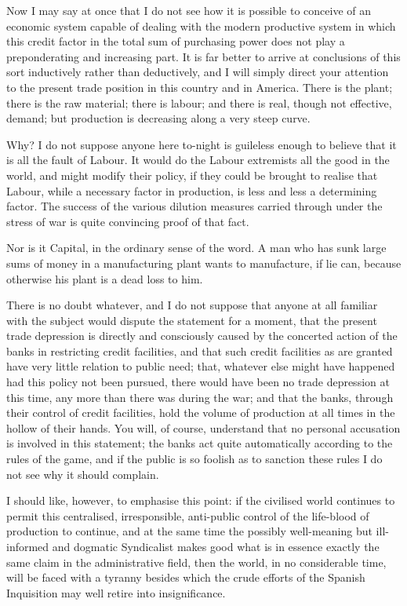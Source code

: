 \documentclass{book}
\begin{document}
Now I may say at once that I do not see how it is possible to conceive of an economic system capable of dealing with the modern productive system in which this credit factor in the total sum of purchasing power does not play a preponderating and increasing part. It is far better to arrive at conclusions of this sort inductively rather than deductively, and I will simply direct your attention to the present trade position in this country and in America. There is the plant; there is the raw material; there is labour; and there is real, though not effective, demand; but production is decreasing along a very steep curve.

Why? I do not suppose anyone here to-night is guileless enough to believe that it is all the fault of Labour. It would do the Labour extremists all the good in the world, and might modify their policy, if they could be brought to realise that Labour, while a necessary factor in production, is less and less a determining factor. The success of the various dilution measures carried through under the stress of war is quite convincing proof of that fact.

Nor is it Capital, in the ordinary sense of the word. A man who has sunk large sums of money in a manufacturing plant wants to manufacture, if lie can, because otherwise his plant is a dead loss to him.

There is no doubt whatever, and I do not suppose that anyone at all familiar with the subject would dispute the statement for a moment, that the present trade depression is directly and consciously caused by the concerted action of the banks in restricting credit facilities, and that such credit facilities as are granted have very little relation to public need; that, whatever else might have happened had this policy not been pursued, there would have been no trade depression at this time, any more than there was during the war; and that the banks, through their control of credit facilities, hold the volume of production at all times in the hollow of their hands. You will, of course, understand that no personal accusation is involved in this statement; the banks act quite automatically according to the rules of the game, and if the public is so foolish as to sanction these rules I do not see why it should complain.

I should like, however, to emphasise this point: if the civilised world continues to permit this centralised, irresponsible, anti-public control of the life-blood of production to continue, and at the same time the possibly well-meaning but ill-informed and dogmatic Syndicalist makes good what is in essence exactly the same claim in the administrative field, then the world, in no considerable time, will be faced with a tyranny besides which the crude efforts of the Spanish Inquisition may well retire into insignificance.
\end{document}
